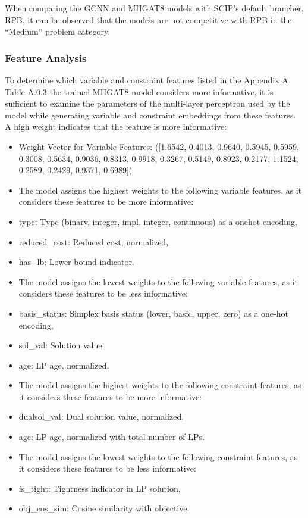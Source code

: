 When comparing the GCNN and MHGAT8 models with SCIP’s default brancher, RPB, it can be observed that the models are not competitive with RPB in the “Medium” problem category.




\subsubsection{Feature Analysis}
To determine which variable and constraint features listed in the Appendix A Table A.0.3 %
the trained MHGAT8 model considers more informative, it is sufficient to examine the parameters of the multi-layer perceptron used by the model while generating variable and constraint embeddings from these features.
A high weight indicates that the feature is more informative:


\begin{itemize}
  \item Weight Vector for Variable Features: ([1.6542, 0.4013, 0.9640, 0.5945, 0.5959, 0.3008, 0.5634, 0.9036, 0.8313, 0.9918, 0.3267, 0.5149, 0.8923, 0.2177, 1.1524, 0.2589, 0.2429, 0.9371, 0.6989])
  \item The model assigns the highest weights to the following variable features, as it considers these features to be more informative:
    \item type: Type (binary, integer, impl. integer, continuous) as a onehot encoding,
    \item reduced\_cost: Reduced cost, normalized,
    \item has\_lb: Lower bound indicator.
  \item The model assigns the lowest weights to the following variable features, as it considers these features to be less informative:
    \item basis\_status: Simplex basis status (lower, basic, upper, zero) as a one-hot encoding,
    \item sol\_val: Solution value,
    \item age: LP age, normalized.
  \item The model assigns the highest weights to the following constraint features, as it considers these features to be more informative:
    \item dualsol\_val: Dual solution value, normalized,
    \item age: LP age, normalized with total number of LPs.
  \item The model assigns the lowest weights to the following constraint features, as it considers these features to be less informative:
    \item is\_tight: Tightness indicator in LP solution,
    \item obj\_cos\_sim: Cosine similarity with objective.
\end{itemize}